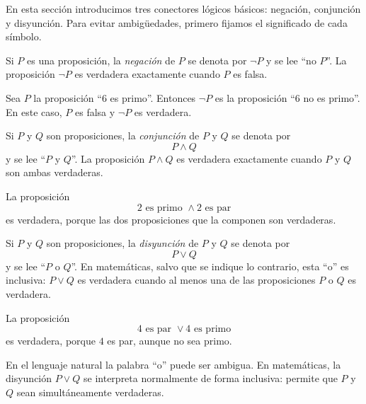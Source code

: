 En esta sección introducimos tres conectores lógicos básicos: negación, conjunción y disyunción. Para evitar ambigüedades, primero fijamos el significado de cada símbolo.

\begin{definicion}[Negación]
Si $P$ es una proposición, la \emph{negación} de $P$ se denota por $\neg P$ y se lee ``no $P$''. La proposición $\neg P$ es verdadera exactamente cuando $P$ es falsa.
\end{definicion}

\begin{ejemplo}
Sea $P$ la proposición ``$6$ es primo''. Entonces $\neg P$ es la proposición ``$6$ no es primo''. En este caso, $P$ es falsa y $\neg P$ es verdadera.
\end{ejemplo}

\begin{definicion}[Conjunción]
Si $P$ y $Q$ son proposiciones, la \emph{conjunción} de $P$ y $Q$ se denota por
\[
  P\wedge Q
\]
y se lee ``$P$ y $Q$''. La proposición $P\wedge Q$ es verdadera exactamente cuando $P$ y $Q$ son ambas verdaderas.
\end{definicion}

\begin{ejemplo}
La proposición
\[
  2 \text{ es primo } \wedge 2 \text{ es par}
\]
es verdadera, porque las dos proposiciones que la componen son verdaderas.
\end{ejemplo}

\begin{definicion}[Disyunción]
Si $P$ y $Q$ son proposiciones, la \emph{disyunción} de $P$ y $Q$ se denota por
\[
  P\vee Q
\]
y se lee ``$P$ o $Q$''. En matemáticas, salvo que se indique lo contrario, esta ``o'' es inclusiva: $P\vee Q$ es verdadera cuando al menos una de las proposiciones $P$ o $Q$ es verdadera.
\end{definicion}

\begin{ejemplo}
La proposición
\[
  4 \text{ es par } \vee 4 \text{ es primo}
\]
es verdadera, porque $4$ es par, aunque no sea primo.
\end{ejemplo}

\begin{advertencia}
En el lenguaje natural la palabra ``o'' puede ser ambigua. En matemáticas, la disyunción $P\vee Q$ se interpreta normalmente de forma inclusiva: permite que $P$ y $Q$ sean simultáneamente verdaderas.
\end{advertencia}

